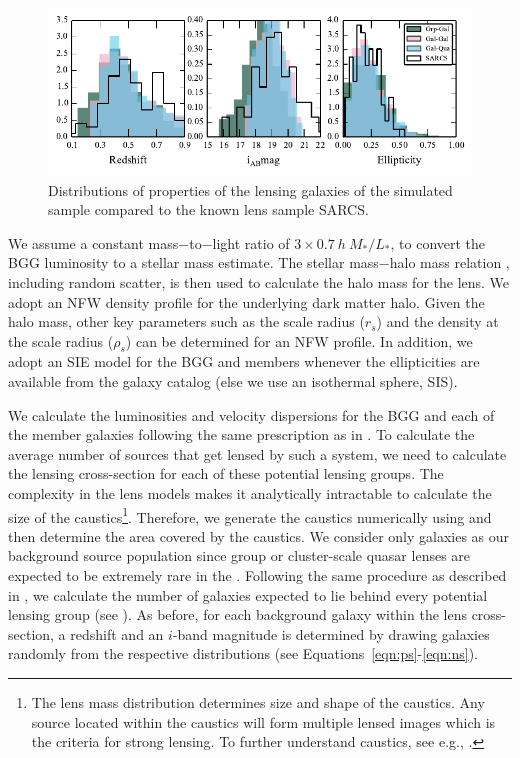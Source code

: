 \documentclass[useAMS,usenatbib,a4paper]{mn2e}
\begin{document}
\begin{figure}
\begin{center}
\includegraphics[scale=1.3]{lensprop.pdf}
\caption{ \label{fig:lensprop}
Distributions of properties of the lensing galaxies of the simulated
sample compared to the known lens sample SARCS.
}
\end{center}
\end{figure}

We assume a constant mass$-$to$-$light ratio of $3 \times
0.7~h~ M_{*}/L_{*}$, to convert the BGG luminosity to a stellar mass
estimate. The stellar mass$-$halo mass relation \citep{Behroozi2013},
including random scatter, is then used to calculate the halo mass for
the lens. We adopt an NFW \citep{Navarro1997} density profile for the
underlying dark matter halo. Given the halo mass, other key parameters
such as the scale radius ($r_s$) and the density at the scale radius
($\rho_s$) can be determined for an NFW profile. In addition, we adopt
an SIE model for the BGG and members whenever the ellipticities are
available from the galaxy catalog (else we use an isothermal sphere,
SIS).

We calculate the luminosities and velocity dispersions for the BGG and each
of the member galaxies following the same prescription as in
. To calculate the average number of sources that get
lensed by such a system, we need to calculate the lensing cross-section
for each of these potential lensing groups. The complexity in the lens
models makes it analytically intractable to calculate the size of the
caustics\footnote{The lens mass distribution determines size and shape
of the caustics. Any source located within the caustics will form
multiple lensed images which is the criteria for strong lensing. To
further understand caustics, see e.g., \citet{Schneider1992}.}.
Therefore, we generate the caustics numerically using \gravlens and then
determine the area covered by the caustics. We consider only galaxies as
our background source population since group or cluster-scale quasar
lenses are expected to be extremely rare in the \cfhtls.  Following the
same procedure as described in , we calculate the
number of galaxies expected to lie behind every potential lensing group
(see ).  As before, for each background galaxy within the
lens cross-section, a redshift and an $i$-band magnitude is determined
by drawing galaxies randomly from the respective distributions (see
Equations~\ref{eqn:ps}-\ref{eqn:ns}).
\end{document}
